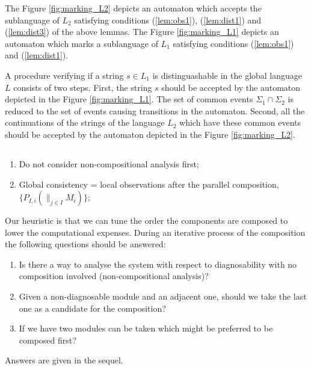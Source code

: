 \documentclass[a4paper, 10pt, conference]{ieeeconf}
\begin{document}
The Figure \ref{fig:marking_L2} depicts an automaton which
accepts the sublanguage of $L_2$ satisfying conditions (\ref{lem:obs1}),
(\ref{lem:dist1}) and (\ref{lem:dist3}) of the above lemmas.
The Figure \ref{fig:marking_L1} depicts an automaton which
marks a sublanguage of $L_1$ satisfying conditions (\ref{lem:obs1}) and
(\ref{lem:dist1}). 

A procedure verifying if a string $s \in L_1$ is distinguashable in the global
language $L$ consists of two steps. First, the string $s$ should be accepted by
the automaton depicted in the Figure \ref{fig:marking_L1}. The set of common
events $\Sigma_1 \cap \Sigma_2$ is reduced to the set of events causing
transitions in the automaton. Second, all the continuations of the strings of
the language $L_2$ which have these common events should be accepted by the
automaton depicted in the Figure
\ref{fig:marking_L2}.

\newpage

\subsection{}
\begin{enumerate}
  \item Do not consider non-compositional analysis first;
  \item Global consistency = local observations after the parallel
  composition, $\{ P_{I,i}(\parallel_{j \in I}M_i)\}$;    
  
\end{enumerate} 

Our heuristic is that we can tune the order the components are composed to lower
the computational expenses. During an iterative process of the composition the
following questions should be answered:
\begin{enumerate}
  \item Is there a way to analyse the system with respect to diagnosability with
  no composition involved (non-compositional analysis)?
  \item Given a non-diagnosable module and an adjacent one, should we take
  the last one as a candidate for the composition?
  \item If we have two modules can be taken which might be preferred to be
  composed first?
\end{enumerate}

Answers are given in the sequel.
\end{document}
